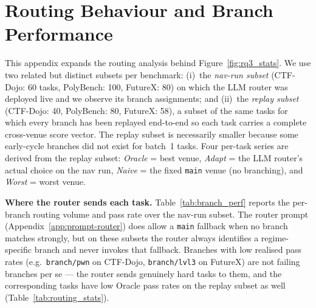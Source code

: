 \documentclass[11pt]{article}
\theoremstyle{plain}
\begin{document}
\begin{table}[t]
\centering\footnotesize
\setlength{\tabcolsep}{5pt}
\caption{Full-stream system contrast complementing the subset-based ablation in Figure~\ref{fig:rq2_stats}. \emph{No-evo} is the no-evolution Sonnet baseline; \emph{Single} is A-Evolve (single-agent evolver); \emph{Multi} is the four-phase multi-agent evolver. The \emph{Peak} column reports the cycle index at which the multi-agent run's cumulative mean was highest, and \emph{Cycles} is the total number of evolution cycles.}
\label{tab:evolution_dynamics}
\end{table}


\section{Routing Behaviour and Branch Performance}
\label{app:branch_perf}

This appendix expands the routing analysis behind Figure~\ref{fig:rq3_stats}. We use two related but distinct subsets per benchmark: (i)~the \emph{nav-run subset} (CTF-Dojo: 60 tasks, PolyBench: 100, FutureX: 80) on which the LLM router was deployed live and we observe its branch assignments; and (ii)~the \emph{replay subset} (CTF-Dojo: 40, PolyBench: 80, FutureX: 58), a subset of the same tasks for which every branch has been replayed end-to-end so each task carries a complete cross-venue score vector. The replay subset is necessarily smaller because some early-cycle branches did not exist for batch~1 tasks. Four per-task series are derived from the replay subset: \emph{Oracle} = best venue, \emph{Adapt} = the LLM router's actual choice on the nav run, \emph{Naive} = the fixed \texttt{main} venue (no branching), and \emph{Worst} = worst venue.

\noindent\textbf{Where the router sends each task.}
Table~\ref{tab:branch_perf} reports the per-branch routing volume and pass rate over the nav-run subset. The router prompt (Appendix~\ref{app:prompt-router}) does allow a \texttt{main} fallback when no branch matches strongly, but on these subsets the router always identifies a regime-specific branch and never invokes that fallback. Branches with low realised pass rates (e.g.\ \texttt{branch/pwn} on CTF-Dojo, \texttt{branch/lvl3} on FutureX) are not failing branches per se --- the router sends genuinely hard tasks to them, and the corresponding tasks have low Oracle pass rates on the replay subset as well (Table~\ref{tab:routing_stats}).
\end{document}
